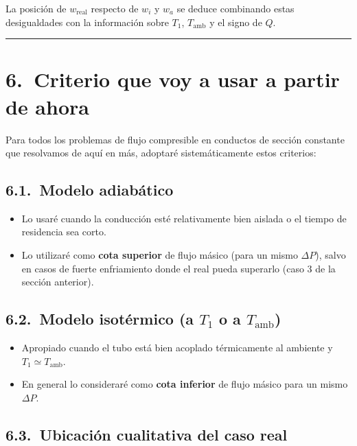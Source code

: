 \documentclass[11pt,a4paper]{article}
\begin{document}
La posición de \(w_\text{real}\) respecto de \(w_i\) y \(w_a\) se deduce
combinando estas desigualdades con la información sobre \(T_1\), \(T_\text{amb}\)
y el signo de \(Q\).

\bigskip
\hrule
\bigskip

\section*{6.\ Criterio que voy a usar a partir de ahora}

Para todos los problemas de flujo compresible en conductos de sección
constante que resolvamos de aquí en más, adoptaré sistemáticamente estos
criterios:

\subsection*{6.1.\ Modelo adiabático}

\begin{itemize}
  \item Lo usaré cuando la conducción esté relativamente bien aislada o el
        tiempo de residencia sea corto.
  \item Lo utilizaré como \textbf{cota superior} de flujo másico (para un mismo
        \(\Delta P\)), salvo en casos de fuerte enfriamiento donde el real
        pueda superarlo (caso 3 de la sección anterior).
\end{itemize}

\subsection*{6.2.\ Modelo isotérmico (a \(T_1\) o a \(T_\text{amb}\))}

\begin{itemize}
  \item Apropiado cuando el tubo está bien acoplado térmicamente al ambiente y
        \(T_1 \simeq T_\text{amb}\).
  \item En general lo consideraré como \textbf{cota inferior} de flujo másico
        para un mismo \(\Delta P\).
\end{itemize}

\subsection*{6.3.\ Ubicación cualitativa del caso real}
\end{document}
